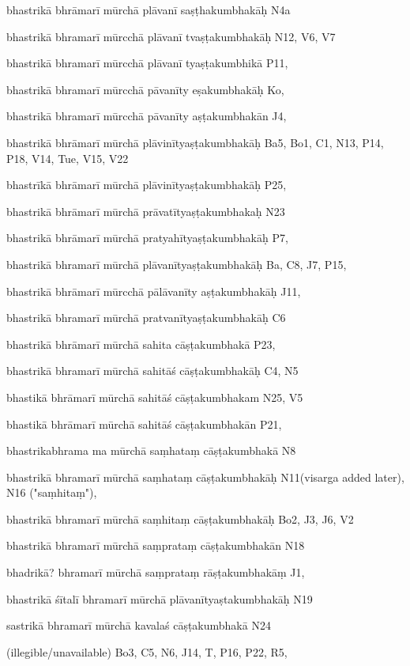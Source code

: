 \begin{marma}[hp02_009]
\begin{marma}[hp02_011]
\begin{marma}[hp02_44cd]
\item[bhastrikā bhrāmarī mūrchā plāvanī saṣṭhakumbhakāḥ] N4a
\item[bhastrikā bhramarī mūrcchā plāvanī tvaṣṭakumbhakāḥ] N12, V6, V7
\item[bhastrikā bhramarī mūrcchā plāvanī tyaṣṭakumbhikā] P11, 
\item[bhastrikā bhramarī mūrcchā pāvanīty eṣakumbhakāḥ] Ko,
\item[bhastrikā bhramarī mūrcchā pāvanīty aṣṭakumbhakān] J4,
\item[bhastrikā bhrāmarī mūrchā plāvinītyaṣṭakumbhakāḥ] Ba5, Bo1, C1, N13, P14, P18, V14, Tue, V15, V22
\item[bhastrīkā bhrāmarī mūrchā plāvinītyaṣṭakumbhakāḥ] P25,
\item[bhastrikā bhrāmarī mūrchā prāvatītyaṣṭakumbhakaḥ] N23
\item[bhastrikā bhrāmarī mūrchā pratyahītyaṣṭakumbhakāḥ] P7,  
\item[bhastrikā bhramarī mūrchā plāvanītyaṣṭakumbhakāḥ] Ba, C8, J7, P15,  
\item[bhastrikā bhrāmarī mūrcchā pālāvanīty aṣṭakumbhakāḥ] J11,
\item[bhastrikā bhramarī mūrchā pratvanītyaṣṭakumbhakāḥ] C6
\item[bhastrikā bhrāmarī mūrchā sahita cāṣṭakumbhakā] P23,
\item[bhastrikā bhramarī mūrchā sahitāś cāṣṭakumbhakāḥ] C4, N5
\item[bhastikā bhrāmarī mūrchā sahitāś cāṣṭakumbhakam] N25, V5
\item[bhastikā bhrāmarī mūrchā sahitāś cāṣṭakumbhakān] P21, 
\item[bhastrikabhrama ma mūrchā saṃhataṃ cāṣṭakumbhakā] N8
\item[bhastrikā bhramarī mūrchā saṃhataṃ cāṣṭakumbhakāḥ] N11(visarga added later), N16 ("saṃhitaṃ"),
\item[bhastrikā bhramarī mūrchā saṃhitaṃ cāṣṭakumbhakāḥ] Bo2, J3, J6, V2
\item[bhastrikā bhramarī mūrchā saṃprataṃ cāṣṭakumbhakān] N18
\item[bhadrikā? bhramarī mūrchā saṃprataṃ rāṣṭakumbhakāṃ] J1,
\item[bhastrikā śītalī bhramarī mūrchā plāvanītyaṣtakumbhakāḥ] N19 
\item[sastrikā bhramarī mūrchā kavalaś cāṣṭakumbhakā] N24
\item[(illegible/unavailable)] Bo3, C5, N6, J14, T, P16, P22, R5,
  \begin{description}


\end{description}
\end{marma}
\end{marma}
\end{marma}
